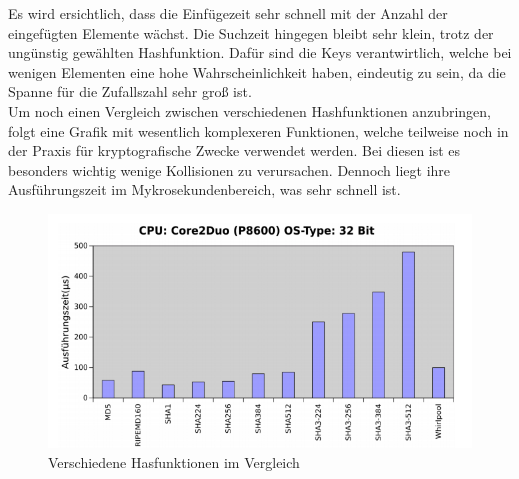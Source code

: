 \documentclass[11pt,a4paper]{article}
\begin{document}
Es wird ersichtlich, dass die Einfügezeit sehr schnell mit der Anzahl der eingefügten Elemente wächst. Die Suchzeit hingegen bleibt sehr klein, trotz der ungünstig gewählten Hashfunktion.
Dafür sind die Keys verantwirtlich, welche bei wenigen Elementen eine hohe Wahrscheinlichkeit haben, eindeutig zu sein, da die Spanne für die Zufallszahl sehr groß ist.\\
Um noch einen Vergleich zwischen verschiedenen Hashfunktionen anzubringen, folgt eine Grafik mit wesentlich komplexeren Funktionen, welche teilweise noch in der Praxis für 
kryptografische Zwecke verwendet werden. Bei diesen ist es besonders wichtig wenige Kollisionen zu verursachen. Dennoch liegt ihre Ausführungszeit im Mykrosekundenbereich, was sehr schnell ist.\\
\begin{figure}[h]
    \centering
    \includegraphics[scale=0.5]{Bilder/hashfunctions_diag.png}
    \caption[Bild 8:]{Verschiedene Hasfunktionen im Vergleich}
\end{figure}
\end{document}
